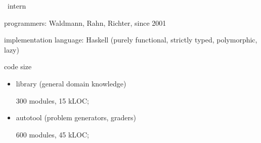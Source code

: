 \begin{slide}{\autotool\ intern}

\parskip 5pt 

programmers: Waldmann, Rahn, Richter, since 2001

implementation language: Haskell
(purely functional, strictly typed, polymorphic, lazy)

code size
\begin{itemize}
\item
  library (general domain knowledge)

  300 modules, 15 kLOC; 
\item
  autotool (problem generators, graders) 

  600 modules, 45 kLOC;
\end{itemize}


\end{slide}
